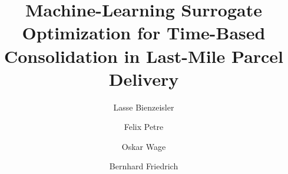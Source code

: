 \documentclass[preprint,12pt,authoryear]{elsarticle}
\begin{document}
\begin{frontmatter} 


\title{Machine-Learning Surrogate Optimization for Time-Based Consolidation in Last-Mile Parcel Delivery}




\author[a]{Lasse Bienzeisler}
\author[a]{Felix Petre}
\author[b]{Oskar Wage}
\author[a]{Bernhard Friedrich}


\address[a]{Institute of Transportation and Urban Engineering, TU Braunschweig, Hermann-Blenk-Straße 42, 38108 Braunschweig, Germany}
\address[b]{Institute of Cartography and Geoinformatics, Leibniz University Hannover, Appelstraße 9a, 30167 Hannover, Germany}


\end{frontmatter}
\end{document}
